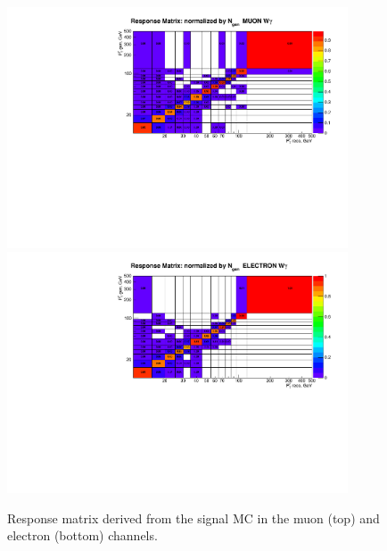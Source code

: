 \begin{figure}[htb]
  \begin{center}
   \includegraphics[width=0.90\textwidth]{../figs/figs_v11/MUON_WGamma/Constants/cResponseMatr_MUON_WGamma__yield_pm_stat.pdf}\\
\includegraphics[width=0.90\textwidth]{../figs/figs_v11/ELECTRON_WGamma/Constants/cResponseMatr_ELECTRON_WGamma__yield_pm_stat.pdf}
  \caption{Response matrix derived from the signal MC in the muon (top) and electron (bottom) channels.}
  \label{fig:respMatrices_Wg}
  \end{center}
\end{figure}



